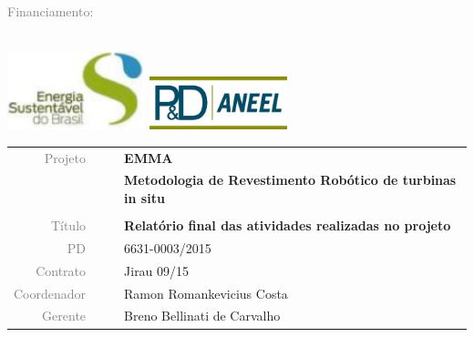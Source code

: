 \textcolor{gray}{Financiamento: } \\ 
\\
\begin{minipage}{\textwidth}
	\centering
	
	\includegraphics[width=0.3\textwidth]{logo/esbr-logo}
	\includegraphics[width=0.3\textwidth]{logo/aneel-logo}

	
\end{minipage}

\vspace{4cm}

\begin{table}[ht!]
	\centering
	\begin{tabular}{r l|l p{12cm} }
		\textcolor{gray}{Projeto} &&& \textbf{\Large EMMA}\\
			&&& \textbf{Metodologia de Revestimento Robótico de turbinas in situ}\\
			&&& \\
		\textcolor{gray}{Título} &&& \textbf{Relatório final das atividades
		realizadas no projeto}\\
		\textcolor{gray}{PD} &&& 6631-0003/2015 \\
		\textcolor{gray}{Contrato} &&& Jirau 09/15\\
		\textcolor{gray}{Coordenador} &&& Ramon Romankevicius Costa \\
		\textcolor{gray}{Gerente} &&& Breno Bellinati de Carvalho \\
	\end{tabular}
\end{table}


\cleardoublepage


